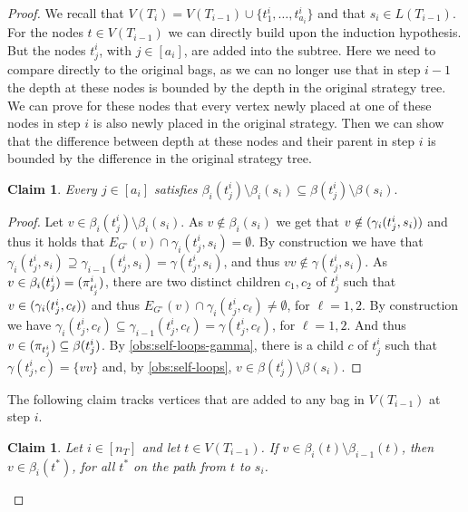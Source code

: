 \documentclass{lmcs}
\theoremstyle{plain}\newtheorem{claim}[thm]{Claim}   %
\newenvironment{claimproof}{\begin{proof}}{\renewcommand{\qedsymbol}{\ensuremath{\blacksquare}}\end{proof}}
\let\boundary\relax
\newcommand{\boundary}{\Delta}
\begin{document}
\begin{proof}
	We recall that $V(T_i)=V(T_{i-1})\cup \{t^i_1,\ldots,t^i_{a_i}\}$ and that $s_i\in L(T_{i-1})$.
	For the nodes $t\in V(T_{i-1})$ we can directly build upon the induction hypothesis.
	But the nodes $t^i_j$, with $j\in [a_i]$, are added into the subtree.
	Here we need to compare directly to the original bags, as we can no longer use that in step $i-1$ the depth at these nodes is bounded by the depth in the original strategy tree.
	We can prove for these nodes that every vertex newly placed at one of these nodes in step $i$ is also newly placed in the original strategy.
	Then we can show that the difference between depth at these nodes and their parent in step $i$ is bounded by the difference in the original strategy tree.
	\begin{claim}
		\label{cl:depth-leafs-new}
		Every $j\in[a_i]$ satisfies $\beta_i(t^i_j)\setminus \beta_i(s_i)\subseteq \beta(t^i_j)\setminus \beta(s_i).$
	\end{claim}
	\begin{claimproof}
		Let $v \in \beta_i(t^i_j) \setminus \beta_i(s_i)$.
		As $v \notin \beta_i(s_i)$ we get that $v\notin\boundary(\gamma_i(t^i_j,s_i))$ and thus it holds that $E_{G^\circ}(v)\cap \gamma_i(t^i_j,s_i) = \emptyset$.
		By construction we have that $\gamma_i(t^i_j,s_i)\supseteq \gamma_{i-1}(t^i_j,s_i) = \gamma(t^i_j,s_i)$, and thus $vv \notin \gamma(t^i_j,s_i)$.
		As $v \in \beta_i(t^i_j)=\boundary(\pi^i_{t^i_j})$, there are two distinct children $c_1,c_2$ of $t^i_j$ such that $v\in\boundary(\gamma_i(t^i_j,c_\ell))$ and thus $E_{G^\circ}(v)\cap \gamma_i(t^i_j,c_\ell) \neq \emptyset$, for $\ell = 1,2$.
		By construction we have $\gamma_i(t^i_j,c_\ell)\subseteq \gamma_{i-1}(t^i_j,c_\ell) = \gamma(t^i_j,c_\ell)$, for $\ell = 1,2$.
		And thus $v\in \boundary(\pi_{t^i_j})\subseteq \beta(t^i_j)$.
		By \autoref{obs:self-loops-gamma}, there is a child $c$ of $t^i_j$ such that $\gamma(t^i_j,c)=\{vv\}$ and, by \autoref{obs:self-loops}, $v\in \beta(t^i_j)\setminus \beta(s_i)$.
	\end{claimproof}
	
	The following claim tracks vertices that are added to any bag in $V(T_{i-1})$ at step $i$.
	
	\begin{claim}
		\label{cl:new-vertex-new}
		Let $i\in [n_T]$ and let $t\in V(T_{i-1})$.
		If $v\in \beta_i(t)\setminus\beta_{i-1}(t)$, then $v\in\beta_i(t^*)$, for all $t^*$ on the path from $t$ to $s_i$.
	\end{claim}
	

\end{proof}
\end{document}
